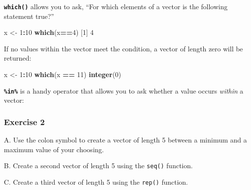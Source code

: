 \documentclass[
]{book}
\newenvironment{Shaded}{\begin{snugshade}}{\end{snugshade}}
\newcommand{\DecValTok}[1]{\textcolor[rgb]{0.00,0.00,0.81}{#1}}
\newcommand{\KeywordTok}[1]{\textcolor[rgb]{0.13,0.29,0.53}{\textbf{#1}}}
\newcommand{\NormalTok}[1]{#1}
\newcommand{\OperatorTok}[1]{\textcolor[rgb]{0.81,0.36,0.00}{\textbf{#1}}}
\newcommand{\OtherTok}[1]{\textcolor[rgb]{0.56,0.35,0.01}{#1}}
\newcommand{\StringTok}[1]{\textcolor[rgb]{0.31,0.60,0.02}{#1}}
\begin{document}
\textbf{\texttt{which()}} allows you to ask, ``For which elements of a vector is the following statement true?''

\begin{Shaded}
\begin{Highlighting}[]
\NormalTok{x <-}\StringTok{ }\DecValTok{1}\OperatorTok{:}\DecValTok{10}
\KeywordTok{which}\NormalTok{(x}\OperatorTok{==}\DecValTok{4}\NormalTok{)}
\NormalTok{[}\DecValTok{1}\NormalTok{] }\DecValTok{4}
\end{Highlighting}
\end{Shaded}

If no values within the vector meet the condition, a vector of length zero will be returned:

\begin{Shaded}
\begin{Highlighting}[]
\NormalTok{x <-}\StringTok{ }\DecValTok{1}\OperatorTok{:}\DecValTok{10}
\KeywordTok{which}\NormalTok{(x }\OperatorTok{==}\StringTok{ }\DecValTok{11}\NormalTok{)}
\KeywordTok{integer}\NormalTok{(}\DecValTok{0}\NormalTok{)}
\end{Highlighting}
\end{Shaded}

\textbf{\texttt{\%in\%}} is a handy operator that allows you to ask whether a value occurs \emph{within} a vector:

\begin{Shaded}
\end{Shaded}

\hypertarget{exercise-2-2}{%
\subsubsection*{Exercise 2}\label{exercise-2-2}}

A. Use the colon symbol to create a vector of length 5 between a minimum and a maximum value of your choosing.

B. Create a second vector of length 5 using the \texttt{seq()} function.

C. Create a third vector of length 5 using the \texttt{rep()} function.
\end{document}
